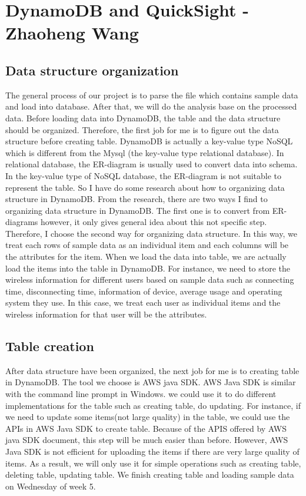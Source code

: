 \section{DynamoDB and QuickSight - Zhaoheng Wang}
	\subsection{Data structure organization}
    The general process of our project is to parse the file which contains sample data and load into database. After that, we will do the analysis base on the processed data. Before loading data into DynamoDB, the table and the data structure should be organized. Therefore, the first job for me is to figure out the data structure before creating table. DynamoDB is actually a key-value type NoSQL which is different from the Mysql (the key-value type relational database). In relational database, the ER-diagram is usually used to convert data into schema. In the key-value type of NoSQL database, the ER-diagram is not suitable to represent the table. So I have do some research about how to organizing data structure in DynamoDB. From the research, there are two ways I find to organizing data structure in DynamoDB. The first one is to convert from ER-diagrams however, it only gives general idea about this not specific step. Therefore, I choose the second way for organizing data structure. In this way, we treat each rows of sample data as an individual item and each columns will be the attributes for the item. When we load the data into table, we are actually load the items into the table in DynamoDB. For instance, we need to store the wireless information for different users based on sample data such as connecting time, disconnecting time, information of device, average usage and operating system they use. In this case, we treat each user as individual items and the wireless information for that user will be the attributes.
    \subsection{Table creation}
    After data structure have been organized, the next job for me is to creating table in DynamoDB. The tool we choose is AWS java SDK. AWS Java SDK is similar with the command line prompt in Windows. we could use it to do different implementations for the table such as creating table, do updating. For instance, if we need to update some items(not large quality) in the table, we could use the APIs in AWS Java SDK to create table. Because of the APIS offered by AWS java SDK document, this step will be much easier than before. However, AWS Java SDK is not efficient for uploading the items if there are very large quality of items. As a result, we will only use it for simple operations such as creating table, deleting table, updating table. We finish creating table and loading sample data on Wednesday of week 5.
